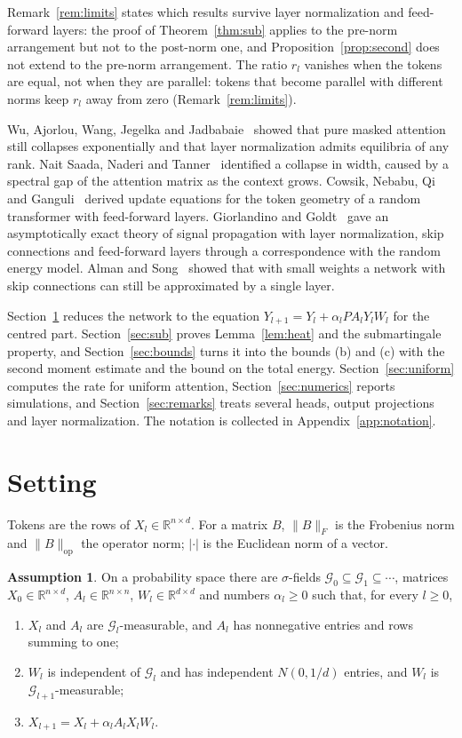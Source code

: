 \documentclass[11pt]{amsart}
\theoremstyle{definition}
\newtheorem{assumption}[theorem]{Assumption}
\theoremstyle{remark}
\numberwithin{equation}{section}
\newcommand{\RR}{\mathbb{R}}
\newcommand{\cG}{\mathcal{G}}
\newcommand{\op}{\mathrm{op}}
\begin{document}
Remark~\ref{rem:limits} states which results survive layer normalization and feed-forward layers: the proof of Theorem~\ref{thm:sub} applies to the pre-norm arrangement but not to the post-norm one, and Proposition~\ref{prop:second} does not extend to the pre-norm arrangement. The ratio $r_l$ vanishes when the tokens are equal, not when they are parallel: tokens that become parallel with different norms keep $r_l$ away from zero (Remark~\ref{rem:limits}).

Wu, Ajorlou, Wang, Jegelka and Jadbabaie~\cite{WAWJJ} showed that pure masked attention still collapses exponentially and that layer normalization admits equilibria of any rank. Nait Saada, Naderi and Tanner~\cite{NNT} identified a collapse in width, caused by a spectral gap of the attention matrix as the context grows. Cowsik, Nebabu, Qi and Ganguli~\cite{CNQG} derived update equations for the token geometry of a random transformer with feed-forward layers. Giorlandino and Goldt~\cite{GG} gave an asymptotically exact theory of signal propagation with layer normalization, skip connections and feed-forward layers through a correspondence with the random energy model. Alman and Song~\cite{AS} showed that with small weights a network with skip connections can still be approximated by a single layer.

Section~\ref{sec:setting} reduces the network to the equation $Y_{l+1}=Y_l+\alpha_lPA_lY_lW_l$ for the centred part. Section~\ref{sec:sub} proves Lemma~\ref{lem:heat} and the submartingale property, and Section~\ref{sec:bounds} turns it into the bounds (b) and (c) with the second moment estimate and the bound on the total energy. Section~\ref{sec:uniform} computes the rate for uniform attention, Section~\ref{sec:numerics} reports simulations, and Section~\ref{sec:remarks} treats several heads, output projections and layer normalization. The notation is collected in Appendix~\ref{app:notation}.

\section{Setting}\label{sec:setting}

Tokens are the rows of $X_l\in\RR^{n\times d}$. For a matrix $B$, $\|B\|_F$ is the Frobenius norm and $\|B\|_\op$ the operator norm; $|\cdot|$ is the Euclidean norm of a vector.

\begin{assumption}\label{ass:main}
On a probability space there are $\sigma$-fields $\cG_0\subseteq\cG_1\subseteq\cdots$, matrices $X_0\in\RR^{n\times d}$, $A_l\in\RR^{n\times n}$, $W_l\in\RR^{d\times d}$ and numbers $\alpha_l\ge0$ such that, for every $l\ge0$,
\begin{enumerate}[label=(\roman*)]
\item $X_l$ and $A_l$ are $\cG_l$-measurable, and $A_l$ has nonnegative entries and rows summing to one;
\item $W_l$ is independent of $\cG_l$ and has independent $N(0,1/d)$ entries, and $W_l$ is $\cG_{l+1}$-measurable;
\item $X_{l+1}=X_l+\alpha_lA_lX_lW_l$.
\end{enumerate}
\end{assumption}
\end{document}
